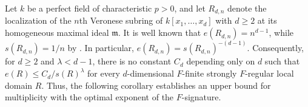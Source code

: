\documentclass[12pt]{amsart}
\numberwithin{equation}{theorem}
\theoremstyle{plain}
\newcommand{\fm}{\mathfrak{m}}
\newcommand{\CC}{\mathbb{C}}
\newcommand{\NN}{\mathbb{N}}
\begin{document}

Let $k$ be a perfect field of characteristic $p>0$, and let $R_{d,n}$ denote the localization of the $n$th Veronese subring of $k[x_1,\ldots,x_d]$ with $d\geq 2$ at its homogeneous maximal ideal $\fm$. It is well known that $e(R_{d,n})=n^{d-1}$, while $s(R_{d,n})=1/n$ by \cite[Example 8 Page 320]{Singh2005}. In particular, $e(R_{d,n})=s(R_{d,n})^{-(d-1)}$. Consequently, for $d\geq 2$ and $\lambda<d-1$, there is no constant $C_d$ depending only on $d$ such that $e(R)\leq C_d/s(R)^\lambda$ for every $d$-dimensional $F$-finite strongly $F$-regular local domain $R$. Thus, the following corollary establishes an upper bound for multiplicity with the optimal exponent of the $F$-signature.
\end{document}

